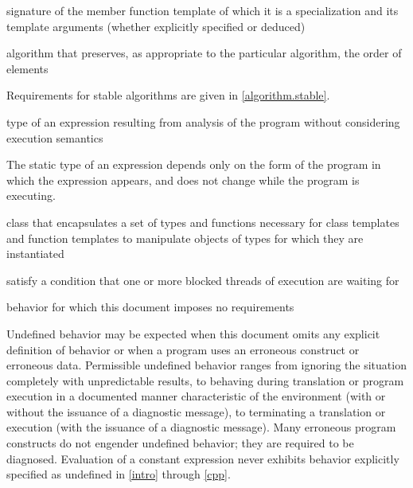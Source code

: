%
 signature of the member function template
of which it is a specialization and its template arguments (whether explicitly specified or deduced)

%
%
algorithm that preserves, as appropriate to the particular algorithm, the order
of elements

\begin{defnote}
Requirements for stable algorithms are given in \ref{algorithm.stable}.
\end{defnote}

%
type of an expression resulting from
analysis of the program without considering execution semantics

\begin{defnote}
The static type of an expression depends only on the form of the program in
which the expression appears, and does not change while the program is
executing.
\end{defnote}

%
class that encapsulates a set of types and functions necessary for class templates and
function templates to manipulate objects of types for which they are instantiated

%
satisfy a condition that one or more blocked threads of execution are waiting for

%
behavior for which this document
imposes no requirements

\begin{defnote}
Undefined behavior may be expected when
this document omits any explicit
definition of behavior or when a program uses an erroneous construct or erroneous data.
Permissible undefined behavior ranges
from ignoring the situation completely with unpredictable results, to
behaving during translation or program execution in a documented manner
characteristic of the environment (with or without the issuance of a
diagnostic message), to terminating a translation or execution (with the
issuance of a diagnostic message). Many erroneous program constructs do
not engender undefined behavior; they are required to be diagnosed.
Evaluation of a constant expression never exhibits behavior explicitly
specified as undefined in \ref{intro} through \ref{cpp}.
\end{defnote}

